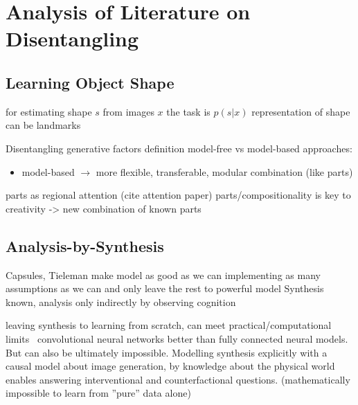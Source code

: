 \chapter{Analysis of Literature on Disentangling}


\section{Learning Object Shape}
for estimating shape $s$ from images $x$ the task is
$p(s|x)$
representation of shape can be landmarks


Disentangling generative factors definition
model-free vs model-based approaches:
\begin{itemize}
	\item model-based $\rightarrow$ more flexible, transferable, modular combination (like parts)
\end{itemize}
parts as regional attention (cite attention paper)
parts/compositionality is key to creativity -> new combination of known parts


\section{Analysis-by-Synthesis}
	Capsules, Tieleman
	make model as good as we can implementing as many assumptions as we can and only leave the rest to powerful model
	Synthesis known, analysis only indirectly by observing cognition

	leaving synthesis to learning from scratch, can meet practical/computational limits \eg\ convolutional neural networks better than fully connected neural models.
	But can also be ultimately impossible. Modelling synthesis explicitly with a causal model about image generation, by knowledge about the physical world enables answering interventional and counterfactional questions. (mathematically impossible to learn from ''pure'' data alone)


